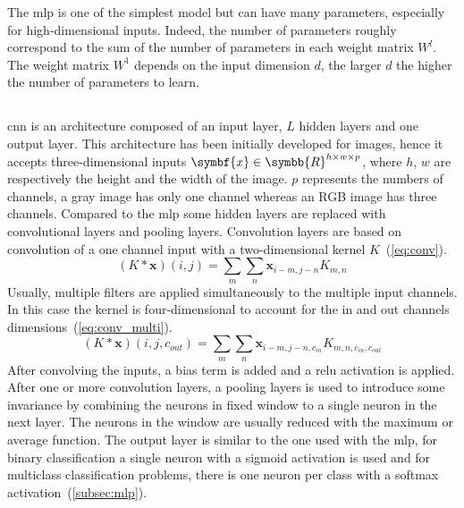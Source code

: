 \documentclass[../main.tex]{subfiles}
\begin{document}
     The \gls{mlp} is one of the simplest model but can have many parameters, especially for high-dimensional inputs.
     Indeed, the number of parameters roughly correspond to the sum of the number of parameters in each weight matrix \(W^{l}\).
     The weight matrix \(W^1\) depends on the input dimension \(d\), the larger \(d\) the higher the number of parameters to learn.

 \subsection{}
     \Gls{cnn} is an architecture composed of an input layer, \(L\) hidden layers and one output layer.
     This architecture has been initially developed for images, hence it accepts three-dimensional inputs \(\symbf{x} \in \symbb{R}^{h\times w \times p} \), where \(h\), \(w\) are respectively the height and the width of the image.
     \(p\) represents the numbers of channels, a gray image has only one channel whereas an RGB image has three channels.
     Compared to the \gls{mlp} some hidden layers are replaced with convolutional layers and pooling layers.
     Convolution layers are based on convolution of a one channel input with a two-dimensional kernel \(K\)~(\cref{eq:conv}).
     \begin{equation}
         \left(K * \symbf{x}\right)\left(i,j\right) =\sum_m\sum_n \symbf{x}_{i-m, j-n}K_{m,n} \label{eq:conv}
     \end{equation}
     Usually, multiple filters are applied simultaneously to the multiple input channels.
     In this case the kernel is four-dimensional to account for the in and out channels dimensions~(\cref{eq:conv_multi}).
     \begin{equation}
         \left(K * \symbf{x}\right)\left(i,j, c_{out}\right) =\sum_m\sum_n \symbf{x}_{i-m, j-n, c_{in}}K_{m,n, c_{in}, c_{out}} \label{eq:conv_multi}
     \end{equation}
     After convolving the inputs, a bias term is added and a \gls{relu} activation is applied.
     After one or more convolution layers, a pooling layers is used to introduce some invariance by combining the neurons in fixed window to a single neuron in the next layer.
     The neurons in the window are usually reduced with the maximum or average function.
     The output layer is similar to the one used with the \gls{mlp}, for binary classification a single neuron with a sigmoid activation is used and for multiclass classification problems, there is one neuron per class with a softmax activation~(\cref{subsec:mlp}).
\end{document}
